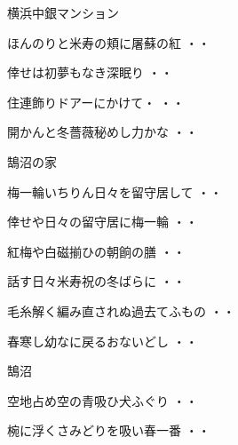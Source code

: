 \vspace{0.6cm}
横浜中銀マンション
\begin{shiika}ほんのりと米寿の頬に屠蘇の紅
\hfill{・・}\end{shiika}
\begin{shiika}倖せは初夢もなき深眠り
\hfill{・・}\end{shiika}
\begin{shiika}住連飾りドアーにかけて・
\hfill{・・}\end{shiika}
\begin{shiika}開かんと冬薔薇秘めし力かな
\hfill{・・}\end{shiika}
\vspace{0.6cm}
鵠沼の家
\begin{shiika}梅一輪いちりん日々を留守居して
\hfill{・・}\end{shiika}
\vspace{0.6cm}
\begin{shiika}倖せや日々の留守居に梅一輪
\hfill{・・}\end{shiika}
\vspace{0.6cm}
\begin{shiika}紅梅や白磁揃ひの朝餉の膳
\hfill{・・}\end{shiika}
\vspace{0.6cm}
\begin{shiika}話す日々米寿祝の冬ばらに
\hfill{・・}\end{shiika}
\vspace{0.6cm}
\begin{shiika}毛糸解く編み直されぬ過去てふもの
\hfill{・・}\end{shiika}
\vspace{0.6cm}
\begin{shiika}春寒し幼なに戻るおないどし
\hfill{・・}\end{shiika}
\vspace{0.6cm}
鵠沼
\begin{shiika}空地占め空の青吸ひ犬ふぐり
\hfill{・・}\end{shiika}
\begin{shiika}椀に浮くさみどりを吸い春一番
\hfill{・・}\end{shiika}
